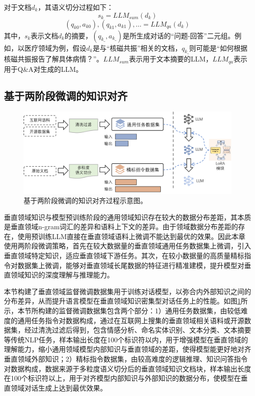 对于文档$d_k$，其语义切分过程如下：
\begin{equation}
	s_k = LLM_{sum}(d_k)
\end{equation}
\begin{equation}
	(q_{k0}, a_{k0}), (q_{k1}, a_{k1}), \dots = LLM_{qa}(d_k)
\end{equation}
其中，$s_k$表示文档$d_k$的摘要，$(q_{k\_}, a_{k\_})$是所生成对话的“问题-回答”二元组。例如，以医疗领域为例，假设$d_k$是与“核磁共振”相关的文档，$q_{k\_}$则可能是“如何根据核磁共振报告了解具体病情？”。$LLM_{sum}$表示用于文本摘要的LLM，$LLM_{qa}$表示用于Q\&A对生成的LLM。

\subsection{基于两阶段微调的知识对齐}

\begin{figure}[htbp]
	\centering
	\includegraphics[scale=0.6]{Fig/finetune_align_process.png}
	\caption{\label{finetune_align_process}基于两阶段微调的知识对齐过程示意图。}
\end{figure}

垂直领域知识与模型预训练阶段的通用领域知识存在较大的数据分布差距，其本质是垂直领域n-gram词汇的差异和语料上下文的差异。由于领域数据分布差距的存在，使用预训练LLM直接在垂直领域语料上微调不能达到最优的效果。因此本章使用两阶段微调策略，首先在较大数据量的垂直领域通用任务数据集上微调，引入垂直领域特定知识，适应垂直领域下游任务。其次，在较小数据量的高质量精标指令对数据集上微调，能够对垂直领域长尾数据的特征进行精准建模，提升模型对垂直领域知识的深度理解与推理能力。

本节构建了垂直领域监督微调数据集用于训练对话模型，以弥合内外部知识之间的分布差异，从而提升语言模型在垂直领域知识密集型对话任务上的性能。如图\ref{finetune_align_process}所示，本节所构建的监督微调数据集包含两个部分：1）通用任务数据集，由较低难度的通用任务指令对数据构成，通过在互联网上搜集的垂直领域相关语料或开源数据集，经过清洗过滤后得到，包含情感分析、命名实体识别、文本分类、文本摘要等传统NLP任务，样本输出长度在100个标识符以内，用于增强模型在垂直领域的理解能力，缩小通用领域模型内部知识与垂直领域的差距，使得模型能更好地对齐垂直领域外部知识；2）精标指令数据集，由较高难度的逻辑推理、知识问答指令对数据构成，数据来源于多粒度语义切分后的垂直领域知识文档块，样本输出长度在100个标识符以上，用于对齐模型内部知识与外部知识的数据分布，使模型在垂直领域对话生成上达到最优效果。

